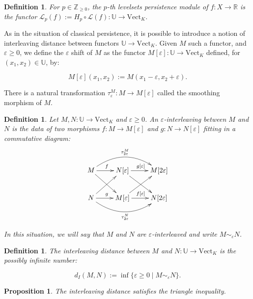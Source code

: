 \documentclass[11pt]{article}
\newtheorem{proposition}[theorem]{Proposition}
\newtheorem{definition}[theorem]{Definition}
\theoremstyle{remark}
\newcommand{\Z}{\mathbb{Z}}
\newcommand{\R}{\mathbb{R}}
\begin{document}
\begin{definition}
For $p \in \Z_{\geq 0}$, the $p$-th levelsets persistence module of $f : X \to \R$ is the functor $\mathcal{L}_p(f) := H_p \circ \mathcal{L}(f) : \mathbb{U} \longrightarrow \text{Vect}_K$.
\end{definition}


As in the situation of classical persistence, it is possible to introduce a notion of interleaving distance between functors $\mathbb{U} \longrightarrow \text{Vect}_K$. Given $M$ such a functor, and $\varepsilon \geq 0$, we define the $\varepsilon$ shift of $M$ as the functor $M[\varepsilon] : \mathbb{U} \longrightarrow \text{Vect}_K $ defined, for $(x_1,x_2)\in \mathbb{U}$, by:

\[M[\varepsilon](x_1,x_2) := M(x_1 - \varepsilon, x_2 + \varepsilon). \]

There is a natural transformation $\tau_\varepsilon^M : M \longrightarrow M[\varepsilon]$ called the smoothing morphism of $M$.

\begin{definition}

Let $M,N: \mathbb{U} \longrightarrow \text{Vect}_K$ and $\varepsilon \geq 0$. An $\varepsilon$-interleaving between $M$ and $N$ is the data of two morphisms $f:M \to M[\varepsilon]$ and $g:N \to N[\varepsilon]$ fitting in a commutative diagram:$$ \xymatrix{
M  \ar[rd]\ar@/^0.7cm/[rr]^{\tau_{2\varepsilon}^M} \ar[r]^{f} & N[\varepsilon]  \ar[rd] \ar[r]^{g[\varepsilon]} & M[2\varepsilon] \\
N  \ar[ur]\ar@/_0.7cm/[rr]_{\tau_{2\varepsilon}^N} \ar[r]^{g} & M[\varepsilon]  \ar[ur] \ar[r]^{f[\varepsilon]} & N[2\varepsilon]
   } $$
   
In this situation, we will say that $M$ and $N$ are $\varepsilon$-interleaved and write {$M\sim_\varepsilon N$}.

\end{definition}


\begin{definition}
The interleaving distance between $M$ and $N: \mathbb{U} \longrightarrow \text{Vect}_K$ is the possibly infinite number:

\[d_I(M,N) := \inf\{\varepsilon\geq 0 \mid M \sim_\varepsilon N\}.\]
\end{definition}

\begin{proposition}
The interleaving distance satisfies the triangle inequality.
\end{proposition}
\end{document}

